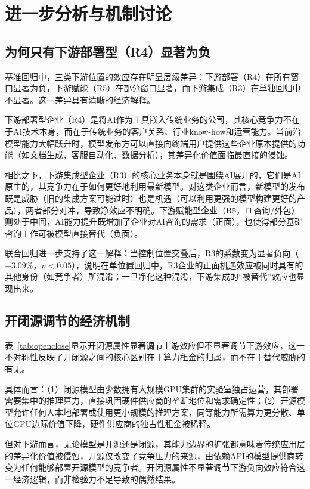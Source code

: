 \documentclass[11pt,fontset=fandol,a4paper]{ctexart}
\newcommand{\changed}[1]{{\color{orange!85!black}#1}}
\begin{document}
\section{进一步分析与机制讨论}

\subsection{为何只有下游部署型（R4）显著为负}

基准回归中，三类下游位置的效应存在明显层级差异：下游部署（R4）在所有窗口显著为负，下游赋能（R5）在部分窗口显著，而下游集成（R3）在单独回归中不显著。这一差异具有清晰的经济解释。

下游部署型企业（R4）是将AI作为工具嵌入传统业务的公司，其核心竞争力不在于AI技术本身，而在于传统业务的客户关系、行业know-how和运营能力。当前沿模型能力大幅跃升时，模型发布方可以直接向终端用户提供这些企业原本提供的功能（如文档生成、客服自动化、数据分析），其差异化价值面临最直接的侵蚀。

相比之下，下游集成型企业（R3）的核心业务本身就是围绕AI展开的，它们是AI原生的，其竞争力在于如何更好地利用最新模型。对这类企业而言，新模型的发布既是威胁（旧的集成方案可能过时）也是机遇（可以利用更强的模型构建更好的产品），两者部分对冲，导致净效应不明确。下游赋能型企业（R5，IT咨询/外包）则处于中间，AI能力提升既增加了企业对AI咨询的需求（正面），也使得部分基础咨询工作可被模型直接替代（负面）。

\changed{联合回归进一步支持了这一解释：当控制位置交叠后，R3的系数变为显著负向（$-3.09\%$，$p<0.05$），说明在单位置回归中，R3企业的正面机遇效应被同时具有的其他身份（如竞争者）所混淆；一旦净化这种混淆，下游集成的“被替代”效应也显现出来。}

\subsection{开闭源调节的经济机制}

表~\ref{tab:openclose}显示开闭源属性显著调节上游效应但不显著调节下游效应，这一不对称性反映了开闭源之间的核心区别在于算力租金的归属，而不在于替代威胁的有无。

具体而言：（1）闭源模型由少数拥有大规模GPU集群的实验室独占运营，其部署需要集中的推理算力，直接巩固硬件供应商的垄断地位和需求确定性；（2）开源模型允许任何人本地部署或使用更小规模的推理方案，同等能力所需算力更分散、单位GPU边际价值下降，硬件供应商的独占性租金被稀释。

但对下游而言，无论模型是开源还是闭源，其能力边界的扩张都意味着传统应用层的差异化价值被侵蚀，开源仅改变了竞争压力的来源，由依赖API的模型提供商转变为任何能够部署开源模型的竞争者。开闭源属性不显著调节下游负向效应符合这一经济逻辑，而非检验力不足导致的偶然结果。
\end{document}
